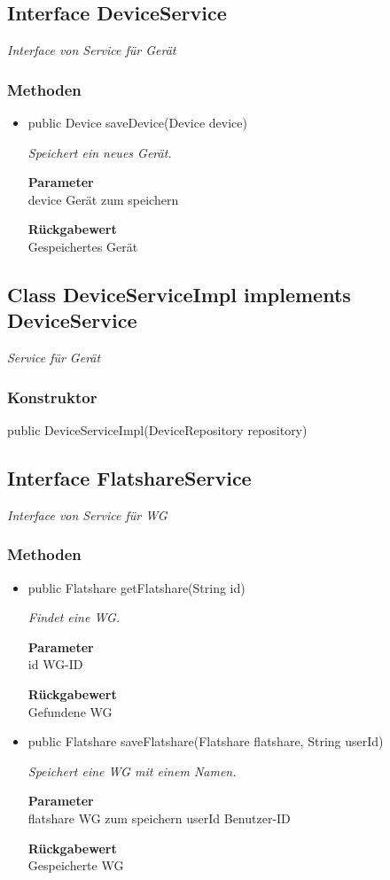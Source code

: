 \documentclass[a4paper]{scrreprt}
\begin{document}
    \subsection{Interface DeviceService}
    \textit{Interface von Service für Gerät}
    \subsubsection{Methoden}
    \begin{itemize}
    	\item{public Device saveDevice(Device device)}
    	
    	\textit{Speichert ein neues Gerät.}
    	
    	\textbf{Parameter} \\
    	device Gerät zum speichern
    	
    	\textbf{Rückgabewert} \\
    	Gespeichertes Gerät
    \end{itemize}
    \subsection{Class DeviceServiceImpl implements DeviceService}
    \textit{Service für Gerät}
    \subsubsection{Konstruktor}
    public DeviceServiceImpl(DeviceRepository repository)
    \subsection{Interface FlatshareService}
    \textit{Interface von Service für WG}
    \subsubsection{Methoden}
    \begin{itemize}
    	\item{public Flatshare getFlatshare(String id)}
    	
    	\textit{Findet eine WG.}
    	
    	\textbf{Parameter} \\
    	id WG-ID
    	
    	\textbf{Rückgabewert} \\
    	Gefundene WG        \item{public Flatshare saveFlatshare(Flatshare flatshare, String userId)}
    	
    	\textit{Speichert eine WG mit einem Namen.}
    	
    	\textbf{Parameter} \\
    	flatshare WG zum speichern
    	userId Benutzer-ID
    	
    	\textbf{Rückgabewert} \\
    	Gespeicherte WG
    \end{itemize}
\end{document}
